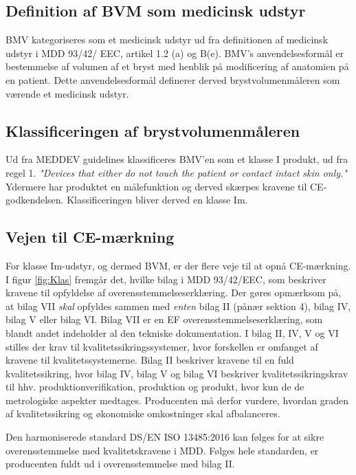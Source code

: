 \subsection{Definition af BVM som medicinsk udstyr}

BMV kategoriseres som et medicinsk udstyr ud fra definitionen af medicinsk udstyr i MDD 93/42/ EEC, artikel 1.2 (a) og B(e). BMV's anvendelsesformål er bestemmelse af volumen af et bryst med henblik på modificering af anatomien på en patient. Dette anvendelsesformål definerer derved brystvolumenmåleren som værende et medicinsk udstyr. 

\subsection{Klassificeringen af brystvolumenmåleren}

Ud fra MEDDEV guidelines klassificeres BMV'en som et klasse I produkt, ud fra regel 1.  
\textit{"Devices that either do not touch the patient or contact intact skin only."} 
Ydermere har produktet en målefunktion og derved skærpes kravene til CE-godkendelsen. Klassificeringen bliver derved en klasse Im.

\subsection{Vejen til CE-mærkning}

For klasse Im-udstyr, og dermed BVM, er der flere veje til at opnå CE-mærkning. I figur \ref{fig:Klas} fremgår det, hvilke bilag i MDD 93/42/EEC, som beskriver kravene til opfyldelse af overensstemmelseserklæring. Der gøres opmærksom på, at bilag VII \textit{skal} opfyldes sammen med \textit{enten} bilag II (pånær sektion 4), bilag IV, bilag V eller bilag VI. Bilag VII er en EF overensstemmelseserklæring, som blandt andet indeholder al den tekniske dokumentation. I bilag II, IV, V og VI stilles der krav til kvalitetssikringssystemer, hvor forskellen er omfanget af kravene til kvalitetssystemerne. Bilag II beskriver kravene til en fuld kvalitetssikring, hvor bilag IV, bilag V og bilag VI beskriver kvalitetssikringskrav til hhv. produktionverifikation, produktion og produkt, hvor kun de de metrologiske aspekter medtages. Producenten må derfor vurdere, hvordan graden af kvalitetssikring og økonomiske omkostninger skal afbalanceres.   

    Den harmoniserede standard DS/EN ISO 13485:2016 kan følges for at sikre overensstemmelse med kvalitetskravene i MDD. Følges hele standarden, er producenten fuldt ud i overensstemmelse med bilag II. 

